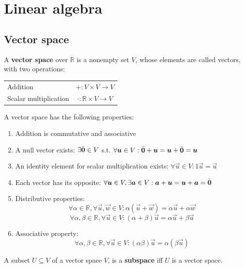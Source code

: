 \chapter{Linear algebra}


\section{Vector space}

A \textbf{vector space} over $\mathbb{R}$ is a nonempty set $V$, whose elements are called vectors, with two operations: 
\begin{center}
    \begin{tabular}{l c}
        Addition & $+ : V \times V \rightarrow V$ \\
        Scalar multiplication & $\cdot : \mathbb{R} \times V \rightarrow V$
    \end{tabular}
\end{center}
A vector space has the following properties:
\begin{enumerate}
    \item Addition is commutative and associative
    \item A null vector exists: $\exists \bar{{\bm{0}}} \in V$ s.t. $\forall {\bm{u}} \in V: \bar{{\bm{0}}} + {\bm{u}} = {\bm{u}} + \bar{{\bm{0}}} = {\bm{u}}$
    \item An identity element for scalar multiplication exists: $\forall \vec{u} \in V: 1\vec{u} = \vec{u}$
    \item Each vector has its opposite: $\forall {\bm{u}} \in V, \exists {\bm{a}} \in V: {\bm{a}} + {\bm{u}} = {\bm{u}} + {\bm{a}} = \bar{{\bm{0}}}$   
    \item Distributive properties:
        \[ \forall \alpha \in \mathbb{R}, \forall \vec{u}, \vec{w} \in V: \alpha(\vec{u} + \vec{w}) = \alpha \vec{u} + \alpha \vec{w} \]
        \[ \forall \alpha, \beta \in \mathbb{R}, \forall \vec{u} \in V: (\alpha + \beta)\vec{u} = \alpha \vec{u} + \beta \vec{u} \]
    \item Associative property:
        \[ \forall \alpha, \beta \in \mathbb{R}, \forall \vec{u} \in V: (\alpha \beta)\vec{u} = \alpha (\beta \vec{u}) \]
\end{enumerate}
%
A subset $U \subseteq V$ of a vector space $V$, is a \textbf{subspace} iff $U$ is a vector space.


